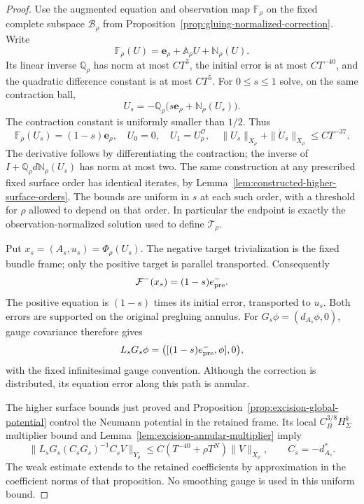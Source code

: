 \documentclass[11pt]{amsart}
\theoremstyle{definition}
\theoremstyle{remark}
\theoremstyle{plain}
\newcommand{\cO}{\mathcal{O}}
\begin{document}
\begin{proof}
Use the augmented equation and observation map
$\mathbb F_\rho$ on the fixed complete subspace $\mathcal B_\rho$
from Proposition~\ref{prop:gluing-normalized-correction}.
Write
\[
 \mathbb F_\rho(U)=\mathbf e_\rho+\mathbb A_\rho U
                              +\mathbb N_\rho(U).
\]
Its linear inverse $\mathbb Q_\rho$ has norm at most $CT^3$,
the initial error is at most $CT^{-40}$, and the quadratic
difference constant is at most $CT^5$. For $0\leq s\leq1$
solve, on the same contraction ball,
\begin{equation}\label{eq:excision-forced-correction-path}
 U_s=-\mathbb Q_\rho
             \bigl(s\mathbf e_\rho+\mathbb N_\rho(U_s)\bigr).
\end{equation}
The contraction constant is uniformly smaller than $1/2$.
Thus
\[
 \mathbb F_\rho(U_s)=(1-s)\mathbf e_\rho,\quad
 U_0=0,\quad U_1=U_\rho^{\cO},\quad
 \|U_s\|_{X_\rho}+\|\dot U_s\|_{X_\rho}\leq CT^{-37}.
\]
The derivative follows by differentiating the contraction;
the inverse of $I+\mathbb Q_\rho d\mathbb N_\rho(U_s)$
has norm at most two. The same construction at any prescribed
fixed surface order has identical iterates, by
Lemma~\ref{lem:constructed-higher-surface-orders}.
The bounds are uniform in $s$ at each such order, with a
threshold for $\rho$ allowed to depend on that order.
In particular the endpoint is exactly the observation-normalized
solution used to define $\mathcal T_\rho$.

Put $x_s=(A_s,u_s)=\Phi_\rho(U_s)$. The negative target
trivialization is the fixed bundle frame; only the positive
target is parallel transported. Consequently
\begin{equation}\label{eq:excision-retained-forcing}
             \mathcal F^-(x_s)=(1-s)e_{\rm pre}^- .
\end{equation}
The positive equation is $(1-s)$ times its initial error,
transported to $u_s$. Both errors are supported on the original
pregluing annulus. For $G_s\phi=(d_{A_s}\phi,0)$, gauge
covariance therefore gives
\[
 L_sG_s\phi=\bigl([(1-s)e_{\rm pre}^-,\phi],0\bigr),
\]
with the fixed infinitesimal gauge convention.
Although the correction is distributed, its equation error
along this path is annular.

The higher surface bounds just proved and
Proposition~\ref{prop:excision-global-potential} control the
Neumann potential in the retained frame. Its local
$C^{3/8}_BH^k_\Sigma$ multiplier bound and
Lemma~\ref{lem:excision-annular-multiplier} imply
\begin{equation}\label{eq:excision-correction-gauge-coupling}
 \|L_sG_s(C_sG_s)^{-1}C_sV\|_{Y_\rho}
       \leq C(T^{-40}+\rho T^N)\|V\|_{X_\rho},
       \qquad C_s=-d_{A_s}^* .
\end{equation}
The weak estimate extends to the retained coefficients by
approximation in the coefficient norms of that proposition.
No smoothing gauge is used in this uniform bound.


\end{proof}
\end{document}
